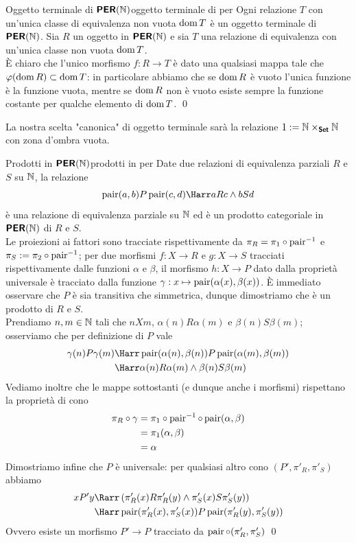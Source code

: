 \documentclass[openany]{book}
\begin{document}
\begin{lemma}{Oggetto terminale di $\text{\sffamily\textbf{PER}}(\mathbb{N})$}{oggetto terminale di per}
    Ogni relazione $T$ con un'unica classe di equivalenza non vuota $\operatorname{dom} T$ è un oggetto terminale di $\text{\sffamily\textbf{PER}}(\mathbb{N})$.
    \proof 
    Sia $R$ un oggetto in $\text{\sffamily\textbf{PER}}(\mathbb{N})$ e sia $T$ una relazione di equivalenza con un'unica classe non vuota $\operatorname{dom} T$.\\ 
    È chiaro che l'unico morfismo $f:R \to T$ è dato una qualsiasi mappa tale che $\varphi(\operatorname{dom} R)\subset \operatorname{dom} T$: in particolare abbiamo che se $\operatorname{dom} R$ è vuoto l'unica funzione è la funzione vuota, mentre se $\operatorname{dom} R$ non è vuoto esiste sempre la funzione costante per qualche elemento di $\operatorname{dom} T$.
    \qed 
\end{lemma}

La nostra scelta "canonica" di oggetto terminale sarà la relazione $1 := \mathbb{N}\times_{\text{\sffamily\textbf{Set}}}\mathbb{N}$ con zona d'ombra vuota.

\begin{lemma}{Prodotti in $\text{\sffamily\textbf{PER}}(\mathbb{N})$}{prodotti in per}
    Date due relazioni di equivalenza parziali $R$ e $S$ su $\mathbb{N}$, la relazione 
    \[\pair(a,b) P \pair(c,d) \Harr aRc \wedge bSd\]
    è una relazione di equivalenza parziale su $\mathbb{N}$ ed è un prodotto categoriale in $\text{\sffamily\textbf{PER}}(\mathbb{N})$ di $R$ e $S$.\\
    Le proiezioni ai fattori sono tracciate rispettivamente da $\pi_R = \pi_1\circ \operatorname{pair}^{-1}$ e $\pi_S := \pi_2\circ \operatorname{pair}^{-1}$; per due morfismi $f:X\to R$ e $g:X\to S$ tracciati rispettivamente dalle funzioni $\alpha$ e $\beta$, il morfismo $h:X\to P$ dato dalla proprietà universale è tracciato dalla funzione $\gamma : x\mapsto \operatorname{pair}(\alpha(x),\beta(x))$.
    \proof 
    È immediato osservare che $P$ è sia transitiva che simmetrica, dunque dimostriamo che è un prodotto di $R$ e $S$.\\
    Prendiamo $n,m \in \mathbb{N}$ tali che $nXm$, $\alpha(n)R\alpha(m)$ e $\beta(n)S\beta(m)$; osserviamo che per definizione di $P$ vale 
    \begin{align*}
        \gamma(n)P\gamma(m) & \Harr \pair(\alpha(n),\beta(n)) P \pair(\alpha(m),\beta(m))\\
        & \Harr \alpha(n)R\alpha(m)\wedge \beta(n)S\beta(m)
    \end{align*}
    Vediamo inoltre che le mappe sottostanti (e dunque anche i morfismi) rispettano la proprietà di cono
    \begin{align*}
        \pi_R\circ \gamma & = \pi_1\circ\operatorname{pair}^{-1}\circ\operatorname{pair}(\alpha,\beta) \\
        & = \pi_1(\alpha,\beta) \\
        & = \alpha
    \end{align*}
    Dimostriamo infine che $P$ è universale: per qualsiasi altro cono $(P', \pi'_R,\pi'_S)$ abbiamo 
    \begin{align*}
        xP'y & \Rarr \left(\pi'_R(x)R\pi'_R(y)\wedge \pi'_S(x)S\pi'_S(y)\right) \\
        & \Harr \pair(\pi'_R(x),\pi'_S(x))P\pair(\pi'_R(y),\pi'_S(y))
    \end{align*}
    Ovvero esiste un morfismo $P'\to P$ tracciato da $\operatorname{pair}\circ(\pi'_R, \pi'_S)$
    \qed
\end{lemma}
\end{document}
